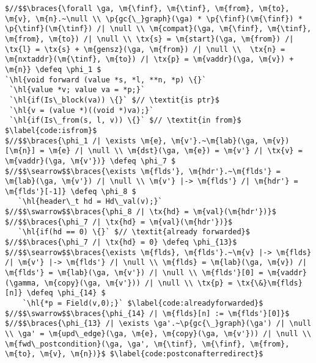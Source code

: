 \renewcommand{\tx}[1]{\scriptsize {\text{#1}}}

\begin{figure*}[!ht]
\vspace{-1ex}
  \begin{lstlisting}[multicols=2]
$//$$\braces{\forall \ga, \m{\finf}, \m{\tinf}, \m{from}, \m{to}, \m{v}, \m{n}.~\null \\ \p{gc{\_}graph}(\ga) * \p{\finf}(\m{\finf}) * \p{\tinf}(\m{\tinf}) /| \null \\ \m{compat}(\ga, \m{\finf}, \m{\tinf}, \m{from}, \m{to}) /| \null \\ \tx{s} = \m{start}(\ga, \m{from}) /| \tx{l} = \tx{s} + \m{gensz}(\ga, \m{from}) /| \null \\  \tx{n} = \m{nxtaddr}(\m{\tinf}, \m{to}) /| \tx{p} = \m{vaddr}(\ga, \m{v}) + \m{n}} \defeq \phi_1 $
`\hl{void forward (value *s, *l, **n, *p) \{}`
 `\hl{value *v; value va = *p;}` 
 `\hl{if(Is\_block(va)) \{}` $// \textit{is ptr}$
 `\hl{v = (value *)((void *)va);}` 
 `\hl{if(Is\_from(s, l, v)) \{}` $// \textit{in from}$ $\label{code:isfrom}$
$//$$\braces{\phi_1 /| \exists \m{e}, \m{v'}.~\m{lab}(\ga, \m{v})[\m{n}] = \m{e} /| \null \\ \m{dst}(\ga, \m{e}) = \m{v'} /| \tx{v} = \m{vaddr}(\ga, \m{v'})} \defeq \phi_7 $
$//$$\searrow$$\braces{\exists \m{flds'}, \m{hdr'}.~\m{flds'} = \m{lab}(\ga, \m{v'}) /| \null \\ \m{v'} |-> \m{flds'} /| \m{hdr'} = \m{flds'}[-1]} \defeq \phi_8 $
   `\hl{header\_t hd = Hd\_val(v);}`
$//$$\swarrow$$\braces{\phi_8 /| \tx{hd} = \m{val}(\m{hdr'})}$
$//$$\braces{\phi_7 /| \tx{hd} = \m{val}(\m{hdr'})}$ 
   `\hl{if(hd == 0) \{}` $// \textit{already forwarded}$
$//$$\braces{\phi_7 /| \tx{hd} = 0} \defeq \phi_{13}$ 
$//$$\searrow$$\braces{\exists \m{flds}, \m{flds'}.~\m{v} |-> \m{flds} /| \m{v'} |-> \m{flds'} /| \null \\ \m{flds} = \m{lab}(\ga, \m{v}) /| \m{flds'} = \m{lab}(\ga, \m{v'}) /| \null \\ \m{flds'}[0] = \m{vaddr}(\gamma, \m{copy}(\ga, \m{v'})) /| \null \\ \tx{p} = \tx{\&}\m{flds}[n]} \defeq \phi_{14} $
    `\hl{*p = Field(v,0);}` $\label{code:alreadyforwarded}$
$//$$\swarrow$$\braces{\phi_{14} /| \m{flds}[n] := \m{flds'}[0]}$
$//$$\braces{\phi_{13} /| \exists \ga'.~\p{gc{\_}graph}(\ga') /| \null \\ \ga' = \m{upd\_edge}(\ga, \m{e}, \m{copy}(\ga, \m{v'})) /| \null \\ \m{fwd\_postcondition}(\ga, \ga', \m{\tinf}, \m{\finf}, \m{from}, \m{to}, \m{v}, \m{n})}$ $\label{code:postconafterredirect}$

\end{lstlisting}
\end{figure*}
